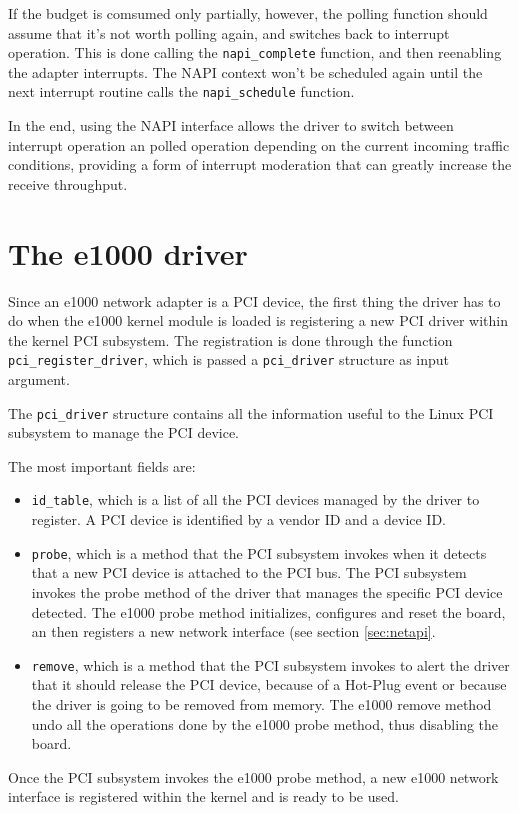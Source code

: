 If the budget is comsumed only partially, however, the polling function should assume that it's not worth polling again, and switches back
to interrupt operation. This is done calling the \texttt{napi\_complete} function, and then reenabling the adapter interrupts. The NAPI
context won't be scheduled again until the next interrupt routine calls the \texttt{napi\_schedule} function.

\vspace{0.5cm}

In the end, using the NAPI interface allows the driver to switch between interrupt operation an polled operation depending on the current
incoming traffic conditions, providing a form of interrupt moderation that can greatly increase the receive throughput.


\section{The e1000 driver}
Since an e1000 network adapter is a PCI device, the first thing the driver has to do when the e1000 kernel module is loaded is 
registering a new PCI driver within the kernel PCI subsystem. The registration is done through the function \texttt{pci\_register\_driver},
which is passed a \texttt{pci\_driver} structure as input argument.

The \texttt{pci\_driver} structure contains all the information useful to the Linux PCI subsystem to manage the PCI device.

The most important fields are:
\begin{itemize}
    \item \texttt{id\_table}, which is a list of all the PCI devices managed by the driver to register. A PCI device is identified by
	  a vendor ID and a device ID.
    \item \texttt{probe}, which is a method that the PCI subsystem invokes when it detects that a new PCI device is attached to
	  the PCI bus. The PCI subsystem invokes the probe method of the driver that manages the specific PCI device
	  detected. The e1000 probe method initializes, configures and reset the board, an then registers a new network interface (see
	  section \ref{sec:netapi}.
    \item \texttt{remove}, which is a method that the PCI subsystem invokes to alert the driver that it should release the PCI device,
	  because of a Hot-Plug event or because the driver is going to be removed from memory. The e1000 remove method undo all the
	  operations done by the e1000 probe method, thus disabling the board.
\end{itemize}

Once the PCI subsystem invokes the e1000 probe method, a new e1000 network interface is registered within the kernel and is ready to be used.